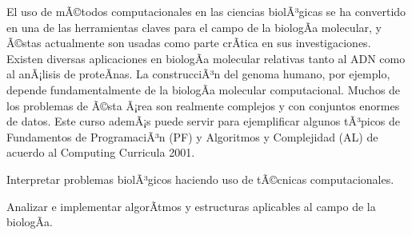 \begin{syllabus}


\begin{justification}
El uso de mÃ©todos computacionales en las ciencias biolÃ³gicas
se ha convertido en una de las herramientas claves para el
campo de la biologÃ­a molecular, y Ã©stas actualmente son usadas
como parte crÃ­tica en sus investigaciones. Existen diversas
aplicaciones en biologÃ­a molecular relativas tanto al ADN como
al anÃ¡lisis de proteÃ­nas. La construcciÃ³n del genoma humano,
por ejemplo, depende fundamentalmente de la biologÃ­a molecular
computacional. Muchos de los problemas de Ã©sta Ã¡rea son realmente
complejos y con conjuntos enormes de datos. Este curso ademÃ¡s
puede servir para ejemplificar algunos tÃ³picos de Fundamentos
de ProgramaciÃ³n (PF) y Algoritmos y Complejidad (AL) de
acuerdo al Computing Curricula 2001.
\end{justification}

\begin{goals}
\item Interpretar problemas biolÃ³gicos haciendo uso de tÃ©cnicas computacionales.
\item Analizar e implementar algorÃ­tmos y estructuras aplicables al campo de la biologÃ­a.
\end{goals}

\begin{outcomes}
\end{outcomes}


\end{syllabus}
